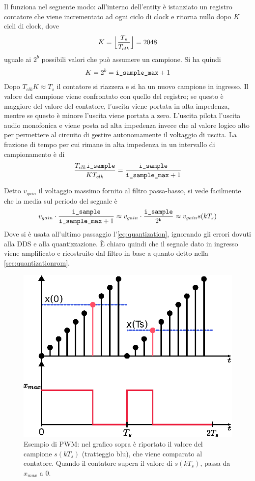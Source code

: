 \begin{center}
\end{center}
Il  funziona nel seguente modo: all'interno dell'entity
è istanziato un registro contatore che viene incrementato ad ogni ciclo di clock
e ritorna nullo dopo $K$ cicli di clock, dove
\[
  K = \Big \lfloor\frac{T_s}{T_{clk}}\Big \rfloor = 2048
\]
uguale ai $2^b$ possibili valori che può assumere un campione.
Si ha quindi
\[
  K = 2^b = \texttt{i\_sample\_max} + 1
\]
Dopo $T_{clk}K \approx T_s$ il contatore si riazzera e si ha un nuovo campione
in ingresso.
Il valore del campione  viene confrontato con quello del registro; se
questo è maggiore del valore del contatore, l'uscita viene portata in alta impedenza,
mentre se questo è minore l'uscita viene portata a zero.
L'uscita  pilota l'uscita audio monofonica e
viene posta ad alta impedenza invece che al valore logico alto per permettere
al circuito di gestire autonomamente il voltaggio di uscita.
La frazione di tempo per cui  rimane in alta impedenza
in un intervallo di campionamento è di
\[
\frac{T_{clk}\texttt{i\_sample}}{K T_{clk}} = 
\frac{\texttt{i\_sample}}{\texttt{i\_sample\_max}+1}
\]

Detto $v_{gain}$ il voltaggio massimo fornito al filtro passa-basso,
si vede facilmente che la media sul periodo del segnale è
\[
v_{gain} \cdot\frac{\texttt{i\_sample}}{\texttt{i\_sample\_max}+1}
 \approx v_{gain} \cdot \frac{\texttt{i\_sample}}{2^{\texttt{b}}} \approx v_{gain}s(k T_s)
\]
Dove si è usata all'ultimo passaggio l'\cref{eq:quantization}, ignorando gli errori
dovuti alla DDS e alla quantizzazione.
È chiaro quindi che il segnale dato in ingresso viene amplificato e
ricostruito dal filtro in base a quanto detto nella \cref{sec:quantizationrom}.

\begin{figure}
	\centering
	\def\svgwidth{\columnwidth}
	\includegraphics[width=0.7\columnwidth]{TeX_files/pwm_ramp.eps}
	\caption{Esempio di PWM: nel grafico sopra è riportato il valore del campione $s(kT_s)$ (tratteggio blu), che viene comparato al contatore.
	Quando il contatore supera il valore di $s(kT_s)$,  passa da $x_{max}$ a $0$. }
\end{figure}

